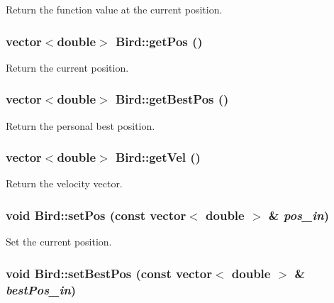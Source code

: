Return the function value at the current position. 

\hypertarget{classBird_278525c49e07d167335c9fdfdcc4c16b}{
\subsubsection{\setlength{\rightskip}{0pt plus 5cm}vector$<$double$>$ Bird::getPos ()}}
\label{classBird_278525c49e07d167335c9fdfdcc4c16b}


Return the current position. 

\hypertarget{classBird_ce844c5f8c4b379fcbf7dac32689d651}{
\subsubsection{\setlength{\rightskip}{0pt plus 5cm}vector$<$double$>$ Bird::getBestPos ()}}
\label{classBird_ce844c5f8c4b379fcbf7dac32689d651}


Return the personal best position. 

\hypertarget{classBird_9f7b66b52ae3579280e62bf8623d4917}{
\subsubsection{\setlength{\rightskip}{0pt plus 5cm}vector$<$double$>$ Bird::getVel ()}}
\label{classBird_9f7b66b52ae3579280e62bf8623d4917}


Return the velocity vector. 

\hypertarget{classBird_c61ff0028ea7d5e664d7aa0ac4379012}{
\subsubsection{\setlength{\rightskip}{0pt plus 5cm}void Bird::setPos (const vector$<$ double $>$ \& {\em pos\_\-in})}}
\label{classBird_c61ff0028ea7d5e664d7aa0ac4379012}


Set the current position. 

\hypertarget{classBird_1899bc1ad99de27864b35d509f87ef96}{
\subsubsection{\setlength{\rightskip}{0pt plus 5cm}void Bird::setBestPos (const vector$<$ double $>$ \& {\em bestPos\_\-in})}}
\label{classBird_1899bc1ad99de27864b35d509f87ef96}


